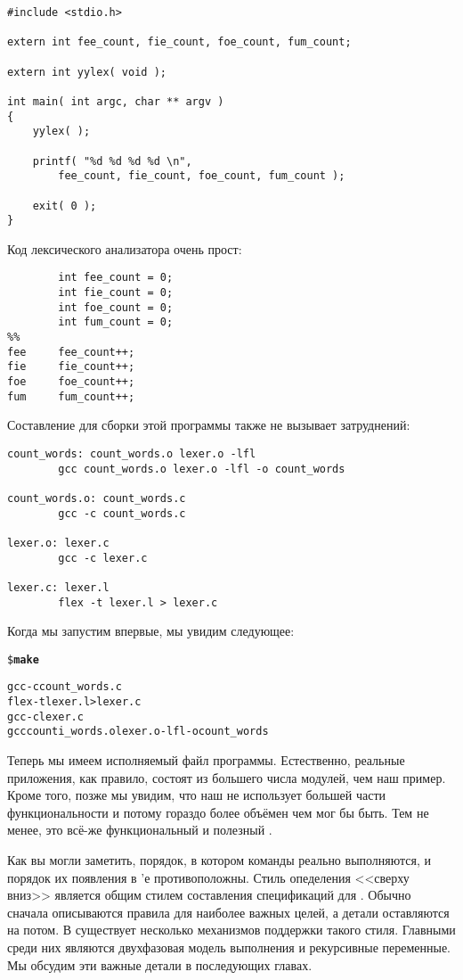 {\footnotesize
\begin{verbatim}
#include <stdio.h>

extern int fee_count, fie_count, foe_count, fum_count;

extern int yylex( void );

int main( int argc, char ** argv )
{
    yylex( );

    printf( "%d %d %d %d \n",
        fee_count, fie_count, foe_count, fum_count );

    exit( 0 );
}
\end{verbatim}
}

Код лексического анализатора очень прост:

{\footnotesize
\begin{verbatim}
        int fee_count = 0;
        int fie_count = 0;
        int foe_count = 0;
        int fum_count = 0;
%%
fee     fee_count++;
fie     fie_count++;
foe     foe_count++;
fum     fum_count++;
\end{verbatim}
}

Составление \Makefile{} для сборки этой программы также не вызывает
затруднений:

{\footnotesize
\begin{verbatim}
count_words: count_words.o lexer.o -lfl
        gcc count_words.o lexer.o -lfl -o count_words

count_words.o: count_words.c
        gcc -c count_words.c

lexer.o: lexer.c
        gcc -c lexer.c

lexer.c: lexer.l
        flex -t lexer.l > lexer.c
\end{verbatim}
}

Когда мы запустим \GNUmake{} впервые, мы увидим следующее:

{\footnotesize
\begin{alltt}
\$ \textbf{make}

gcc -c count\_words.c
flex -t lexer.l > lexer.c
gcc -c lexer.c
gcc counti\_words.o lexer.o -lfl -ocount\_words
\end{alltt}
}

Теперь мы имеем исполняемый файл программы. Естественно, реальные
приложения, как правило, состоят из большего числа модулей, чем наш
пример. Кроме того, позже мы увидим, что наш \Makefile{} не использует
большей части функциональности \GNUmake{} и потому гораздо более
объёмен чем мог бы быть. Тем не менее, это всё-же функциональный и
полезный \Makefile{}.

Как вы могли заметить, порядок, в котором команды реально выполняются,
и порядок их появления в \Makefile{}'е противоположны. Стиль
опеделения <<сверху вниз>> является общим стилем составления
спецификаций для \GNUmake{}. Обычно сначала описываются правила для
наиболее важных целей, а детали оставляются на потом. В \GNUmake{}
существует несколько механизмов поддержки такого стиля. Главными среди
них являются двухфазовая модель выполнения \GNUmake{} и рекурсивные
переменные. Мы обсудим эти важные детали в последующих главах.
